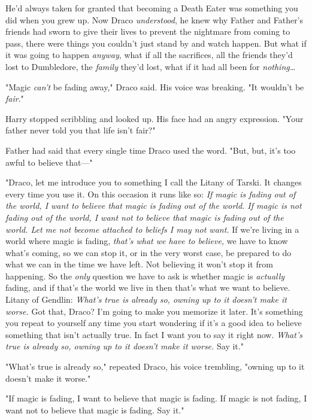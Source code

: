 He'd always taken for granted that becoming a Death Eater was something you did
when you grew up. Now Draco \emph{understood}, he knew why Father and Father's
friends had sworn to give their lives to prevent the nightmare from coming to
pass, there were things you couldn't just stand by and watch happen. But what
if it was going to happen \emph{anyway}, what if all the sacrifices, all the
friends they'd lost to Dumbledore, the \emph{family} they'd lost, what if it
had all been for \emph{nothing{\ldots}}

"Magic \emph{can't} be fading away," Draco said. His voice was breaking. "It
wouldn't be \emph{fair}."

Harry stopped scribbling and looked up. His face had an angry expression. "Your
father never told you that life isn't fair?"

Father had said that every single time Draco used the word. "But, but, it's too
awful to believe that---"

"Draco, let me introduce you to something I call the Litany of Tarski. It
changes every time you use it. On this occasion it runs like so: \emph{If magic
is fading out of the world, I want to believe that magic is fading out of the
world. If magic is not fading out of the world, I want not to believe that
magic is fading out of the world. Let me not become attached to beliefs I may
not want.} If we're living in a world where magic is fading, \emph{that's what
we have to believe,} we have to know what's coming, so we can stop it, or in
the very worst case, be prepared to do what we can in the time we have left.
Not believing it won't stop it from happening. So the \emph{only} question we
have to ask is whether magic is \emph{actually} fading, and if that's the world
we live in then that's what we want to believe. Litany of Gendlin: \emph{What's
true is already so, owning up to it doesn't make it worse.} Got that, Draco?
I'm going to make you memorize it later. It's something you repeat to yourself
any time you start wondering if it's a good idea to believe something that
isn't actually true. In fact I want you to say it right now. \emph{What's true
is already so, owning up to it doesn't make it worse.} Say it."

"What's true is already so," repeated Draco, his voice trembling, "owning up to
it doesn't make it worse."

"If magic is fading, I want to believe that magic is fading. If magic is not
fading, I want not to believe that magic is fading. Say it."

